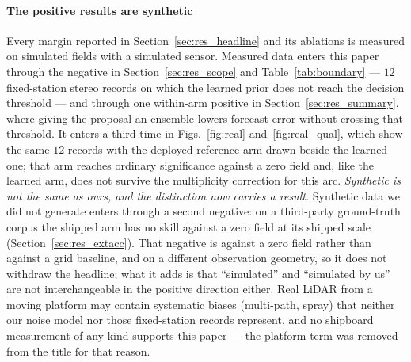 \documentclass[review]{elsarticle}
\begin{document}
\paragraph{The positive results are synthetic}
Every margin reported in
Section~\ref{sec:res_headline} and its ablations is measured on simulated fields
with a simulated sensor. Measured data enters this paper through the negative
in Section~\ref{sec:res_scope} and Table~\ref{tab:boundary} --- $12$ fixed-station
stereo records on which the learned prior does not reach the decision threshold ---
and through one within-arm positive in Section~\ref{sec:res_summary}, where giving
the proposal an ensemble lowers forecast error without crossing that threshold.
It enters a third time in Figs.~\ref{fig:real} and~\ref{fig:real_qual}, which show
the same $12$ records with the deployed reference arm drawn beside the learned one;
that arm reaches ordinary significance against a zero field and, like the learned
arm, does not survive the multiplicity correction for this arc.
\emph{Synthetic is not the same as ours, and the distinction now carries a result.}
Synthetic data we did not generate enters through a second negative: on a
third-party ground-truth corpus the shipped arm has no skill against a zero field at
its shipped scale (Section~\ref{sec:res_extacc}). That negative is against a zero
field rather than against a grid baseline, and on a different observation geometry,
so it does not withdraw the headline; what it adds is that ``simulated'' and
``simulated by us'' are not interchangeable in the positive direction either.
Real LiDAR from a moving
platform may contain systematic biases (multi-path, spray) that neither our noise
model nor those fixed-station records represent, and no shipboard measurement of
any kind supports this paper --- the platform term was removed from the title for
that reason.

\end{document}
